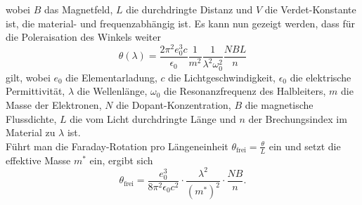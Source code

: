 wobei $B$ das Magnetfeld, $L$ die durchdringte Distanz und $V$ die Verdet-Konstante ist, die material- und frequenzabhängig ist. \cite{heintze}
Es kann nun gezeigt werden, dass für die Poleraisation des Winkels weiter
\begin{equation}
    \theta(\lambda) = \frac{2 \pi^2 e_0^3 c}{\epsilon_0} \frac{1}{m^2} \frac{1}{\lambda^2 \omega_0^2} \frac{NBL}{n}
    \label{eq:theta_ohne_effektivemasse}
\end{equation}
gilt, wobei $e_0$ die Elementarladung, $c$ die Lichtgeschwindigkeit, $\epsilon_0$ die elektrische Permittivität, $\lambda$ die Wellenlänge, $\omega_0$ die Resonanzfrequenz des Halbleiters, $m$ die Masse der Elektronen, $N$ die Dopant-Konzentration, $B$ die magnetische
Flussdichte, $L$ die vom Licht durchdringte Länge und $n$ der Brechungsindex im Material zu $\lambda$ ist.\\
Führt man die Faraday-Rotation pro Längeneinheit $\theta_\text{frei} = \frac{\theta}{L}$ ein und setzt die effektive Masse $m^{*}$ ein, ergibt sich
\begin{equation}
    \theta_\text{frei} = \frac{e_0^3}{8 \pi^2 \epsilon_0 c^2} \cdot \frac{\lambda^2}{(m^{*})^2} \cdot \frac{NB}{n}. 
    \label{eq:theta_frei}
\end{equation}
\cite{anhang}